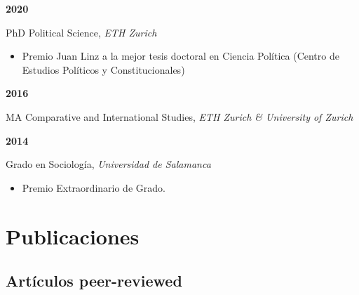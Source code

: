\documentclass[a4paper, 12pt]{article}
\renewcommand\labelitemi{\textbf{--}}
\begin{document}
\noindent
\begin{minipage}[t]{0.1\textwidth}
  \flushleft
	\textbf{2020}
\end{minipage}
\begin{minipage}[t]{0.9\textwidth}
  PhD Political Science, \textit{ETH Zurich}
	\vspace{-5pt}
	\begin{itemize}[leftmargin=18pt]\small
		\renewcommand\labelitemi{{\boldmath$\cdot$}}
	  \item Premio Juan Linz a la mejor tesis doctoral en Ciencia Política (Centro de Estudios Políticos y Constitucionales)
	\end{itemize}
\end{minipage}

\vspace{10pt}

\noindent
\begin{minipage}[t]{0.1\textwidth}
  \flushleft
	\textbf{2016}
\end{minipage}
\begin{minipage}[t]{0.9\textwidth}
  MA Comparative and International Studies, \textit{ETH Zurich \& University of Zurich}
\end{minipage}


\noindent
\begin{minipage}[t]{0.1\textwidth}
  \flushleft
	\textbf{2014}
\end{minipage}
\begin{minipage}[t]{0.9\textwidth}
  Grado en Sociología, \textit{Universidad de Salamanca}
  \vspace{-5pt}
	\begin{itemize}[leftmargin=18pt]\small
		\renewcommand\labelitemi{{\boldmath$\cdot$}}
	  \item Premio Extraordinario de Grado.
	\end{itemize}
\end{minipage}

\section*{Publicaciones}

\subsection*{Artículos peer-reviewed}
\end{document}
